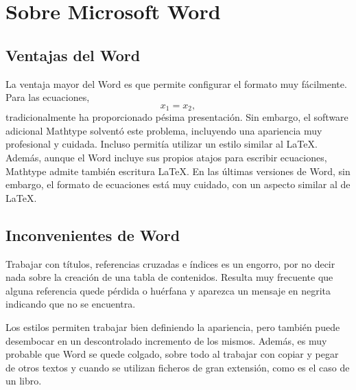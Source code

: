 \chapter{Sobre Microsoft Word\tsp{\textregistered}}

\section{Ventajas del Word\tsp{\textregistered}}
La ventaja mayor del Word\tsp{\textregistered} es que permite configurar el formato muy fácilmente. Para las ecuaciones,
\begin{equation}
x_{1}=x_{2},
\end{equation}
tradicionalmente ha proporcionado pésima presentación. Sin embargo, el software adicional Mathtype\tsp{\textregistered} solventó este problema, incluyendo una apariencia muy profesional y cuidada. Incluso permitía utilizar un estilo similar al \LaTeX\xspace. Además, aunque el Word\tsp{\textregistered} incluye sus propios atajos para escribir ecuaciones,  Mathtype\tsp{\textregistered} admite también escritura \LaTeX\xspace. En las últimas versiones de Word\tsp{\textregistered}, sin embargo, el formato de ecuaciones está muy cuidado, con un aspecto similar al de \LaTeX.


\section{Inconvenientes de Word\tsp{\textregistered}}
Trabajar con títulos, referencias cruzadas e índices es un engorro, por no decir nada sobre la creación de una tabla de contenidos. Resulta muy frecuente que alguna referencia quede pérdida o huérfana y aparezca un mensaje en negrita indicando que  no se encuentra. 

Los estilos permiten trabajar bien definiendo la apariencia, pero también puede desembocar en un descontrolado incremento de los mismos. Además, es muy probable que Word\tsp{\textregistered} se quede colgado, sobre todo al trabajar con copiar y pegar de otros textos y cuando se utilizan ficheros de gran extensión, como es el caso de un libro.



